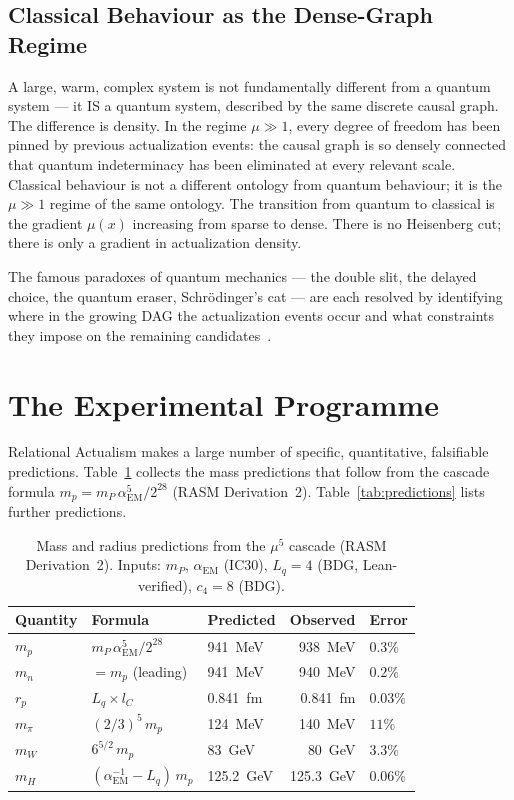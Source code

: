 \documentclass[11pt,a4paper]{article}
\begin{document}
\subsection{Classical Behaviour as the Dense-Graph Regime}

A large, warm, complex system is not fundamentally different from a
quantum system --- it IS a quantum system, described by the same
discrete causal graph. The difference is density. In the regime
$\mu \gg 1$, every degree of freedom has been pinned by previous
actualization events: the causal graph is so densely connected that
quantum indeterminacy has been eliminated at every relevant scale.
Classical behaviour is not a different ontology from quantum behaviour;
it is the $\mu \gg 1$ regime of the same ontology. The transition
from quantum to classical is the gradient $\mu(x)$ increasing from
sparse to dense. There is no Heisenberg cut; there is only a
gradient in actualization density.

The famous paradoxes of quantum mechanics --- the double slit, the
delayed choice, the quantum eraser, Schr\"{o}dinger's cat --- are each
resolved by identifying where in the growing DAG the actualization
events occur and what constraints they impose on the remaining
candidates~\citep{Sandeman2026RAQM}.

\section{The Experimental Programme}
\label{sec:experiment}

Relational Actualism makes a large number of specific, quantitative,
falsifiable predictions. Table~\ref{tab:masses} collects the mass
predictions that follow from the cascade formula
$m_p = m_P\,\alpha_{\mathrm{EM}}^5/2^{28}$ (RASM Derivation~2).
Table~\ref{tab:predictions} lists further predictions.

\begin{table}[ht]
\centering
\caption{Mass and radius predictions from the $\mu^5$ cascade
(RASM Derivation~2). Inputs: $m_P$, $\alpha_{\mathrm{EM}}$ (IC30),
$L_q = 4$ (BDG, Lean-verified), $c_4 = 8$ (BDG).}
\label{tab:masses}
\renewcommand{\arraystretch}{1.3}
\begin{tabular}{lllrl}
\toprule
Quantity & Formula & Predicted & Observed & Error \\
\midrule
$m_p$ & $m_P\,\alpha_{\mathrm{EM}}^5/2^{28}$ & 941~MeV & 938~MeV & $0.3\%$ \\
$m_n$ & $= m_p$ (leading) & 941~MeV & 940~MeV & $0.2\%$ \\
$r_p$ & $L_q \times l_C$ & 0.841~fm & 0.841~fm & $0.03\%$ \\
$m_\pi$ & $(2/3)^5\,m_p$ & 124~MeV & 140~MeV & $11\%$ \\
$m_W$ & $6^{5/2}\,m_p$ & 83~GeV & 80~GeV & $3.3\%$ \\
$m_H$ & $(\alpha_{\mathrm{EM}}^{-1} - L_q)\,m_p$ & 125.2~GeV & 125.3~GeV & $0.06\%$ \\
\bottomrule
\end{tabular}
\end{table}
\end{document}
